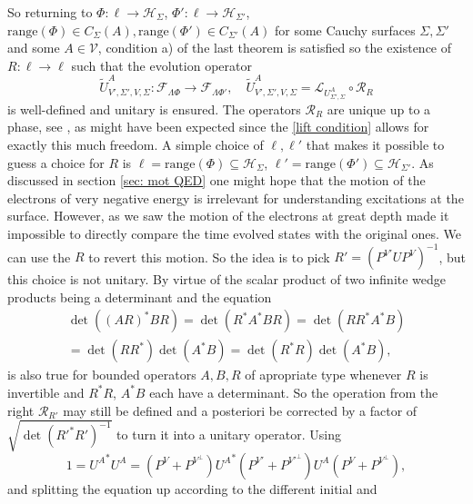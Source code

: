 \documentclass[b5paper,draft,openbib,12pt]{memoir}
\begin{document}
So returning to \(\Phi:\ell\rightarrow \mathcal{H}_\Sigma\), 
\(\Phi':\ell\rightarrow \mathcal{H}_{\Sigma'}\), 
\(\mathrm{range}(\Phi)\in C_{\Sigma}(A),
\mathrm{range}(\Phi')\in C_{\Sigma'}(A)\) for some 
Cauchy surfaces \(\Sigma, \Sigma'\) and some \(A\in\mathcal{V}\),
condition a) of the last theorem is satisfied so 
the existence of \(R:\ell \rightarrow \ell\) 
such that the evolution operator 
\begin{equation}
  \tilde{U}^A_{V',\Sigma',V,\Sigma}:\mathcal{F}_{\mathsf{\Lambda}\Phi}\rightarrow \mathcal{F}_{\mathsf{\Lambda}\Phi'},
  \quad \tilde{U}^A_{V',\Sigma',V,\Sigma}= \mathcal{L}_{U^A_{\Sigma',\Sigma}} \circ \mathcal{R}_R
\end{equation}
is well-defined and unitary is ensured. 
The operators 
\(\mathcal{R}_R\) are unique up to a phase, see 
\cite[Cor. 2.28]{ivp0}, as might have been expected since 
the \eqref{lift condition} allows for 
exactly this much freedom. A simple choice of 
\(\ell, \ell'\) that makes it possible to guess a 
choice for \(R\) is \(\ell=\mathrm{range}(\Phi)\subseteq \mathcal{H}_\Sigma\),
\(\ell'=\mathrm{range}(\Phi')\subseteq \mathcal{H}_{\Sigma'}\).
As discussed in section \ref{sec: mot QED} one might hope 
that the motion of the electrons of very negative energy
is irrelevant for understanding excitations at the surface. 
However, as we saw the motion of the electrons at great depth
made it impossible to directly compare the time evolved 
states with the original ones.
We can use the \(R\) to revert this motion.  
So the idea is to pick \(R'= (P^{V'}U P^V)^{-1}\), but 
this choice is not unitary. By virtue of the scalar product 
of two infinite wedge products being a determinant and 
the equation 
\begin{align}\label{right op calculation}
  \det((A R)^* B R)= \det(R^* A^* B R)
  = \det (R R^* A^* B)\\
  = \det (R R^*) \det (A^* B)
  =\det ( R^* R) \det (A^* B),
\end{align}
is also true for bounded operators \(A,B,R\) 
of apropriate type whenever 
\(R\) is invertible and \(R^* R\), \(A^*B\) each have 
a determinant. So the operation from the 
right \(\mathcal{R}_{R'}\) may still be defined and
a posteriori be corrected by a factor of 
\(\sqrt{\det ( {R'}^* R')^{-1}}\) to turn 
it into a unitary operator.
Using
\begin{equation}
1= {U^A}^* U^A =(P^V+P^{V^\perp}) {U^A}^* (P^{V'}+P^{{V'}^\perp}) U^A (P^V+P^{V^\perp}),
\end{equation}
and splitting 
the equation up according to the different initial and 
\end{document}
